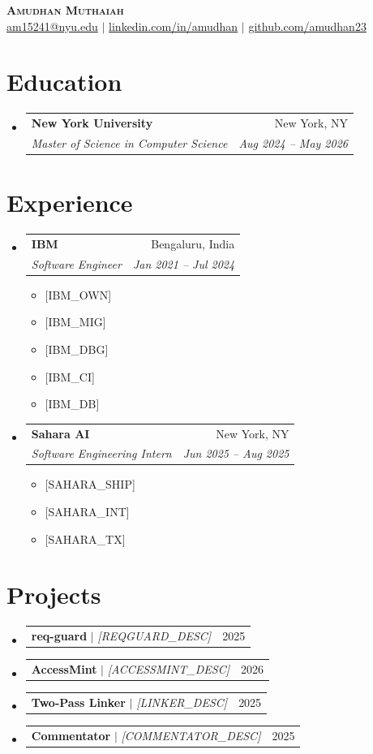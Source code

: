 \documentclass[letterpaper,11pt]{article}
\makeatletter
\newcommand{\resumeItem}[1]{\item\small{#1 \vspace{-2pt}}}
\newcommand{\resumeSubheading}[4]{
  \vspace{-2pt}\item
    \begin{tabular*}{0.97\textwidth}[t]{l@{\extracolsep{\fill}}r}
      \textbf{#1} & #2 \\
      \textit{\small#3} & \textit{\small #4} \\
    \end{tabular*}\vspace{-7pt}
}
\newcommand{\resumeProjectHeading}[2]{
    \item
    \begin{tabular*}{0.97\textwidth}{l@{\extracolsep{\fill}}r}
      \small#1 & #2 \\
    \end{tabular*}\vspace{-7pt}
}
\newcommand{\resumeSubHeadingListStart}{\begin{itemize}[leftmargin=0.15in, label={}]}
\newcommand{\resumeSubHeadingListEnd}{\end{itemize}}
\newcommand{\resumeItemListStart}{\begin{itemize}}
\newcommand{\resumeItemListEnd}{\end{itemize}\vspace{-5pt}}
\makeatother
\begin{document}
\begin{center}
    \textbf{\Huge \scshape Amudhan Muthaiah} \\ \vspace{1pt}
    \small
    \href{mailto:am15241@nyu.edu}{am15241@nyu.edu} $|$
    \href{https://linkedin.com/in/amudhan}{linkedin.com/in/amudhan} $|$
    \href{https://github.com/amudhan23}{github.com/amudhan23}
\end{center}

\section{Education}
  \resumeSubHeadingListStart
    \resumeSubheading
      {New York University}{New York, NY}
      {Master of Science in Computer Science}{Aug 2024 -- May 2026}
  \resumeSubHeadingListEnd

\section{Experience}
  \resumeSubHeadingListStart
    \resumeSubheading
      {IBM}{Bengaluru, India}
      {Software Engineer}{Jan 2021 -- Jul 2024}
      \resumeItemListStart
        \resumeItem{[IBM_OWN]}
        \resumeItem{[IBM_MIG]}
        \resumeItem{[IBM_DBG]}
        \resumeItem{[IBM_CI]}
        \resumeItem{[IBM_DB]}
      \resumeItemListEnd

    \resumeSubheading
      {Sahara AI}{New York, NY}
      {Software Engineering Intern}{Jun 2025 -- Aug 2025}
      \resumeItemListStart
        \resumeItem{[SAHARA_SHIP]}
        \resumeItem{[SAHARA_INT]}
        \resumeItem{[SAHARA_TX]}
      \resumeItemListEnd
  \resumeSubHeadingListEnd

\section{Projects}
  \resumeSubHeadingListStart
    \resumeProjectHeading
      {\textbf{req-guard} $|$ \emph{[REQGUARD_DESC]}}{2025}
    \resumeProjectHeading
      {\textbf{AccessMint} $|$ \emph{[ACCESSMINT_DESC]}}{2026}
    \resumeProjectHeading
      {\textbf{Two-Pass Linker} $|$ \emph{[LINKER_DESC]}}{2025}
    \resumeProjectHeading
      {\textbf{Commentator} $|$ \emph{[COMMENTATOR_DESC]}}{2025}
  \resumeSubHeadingListEnd
\end{document}
